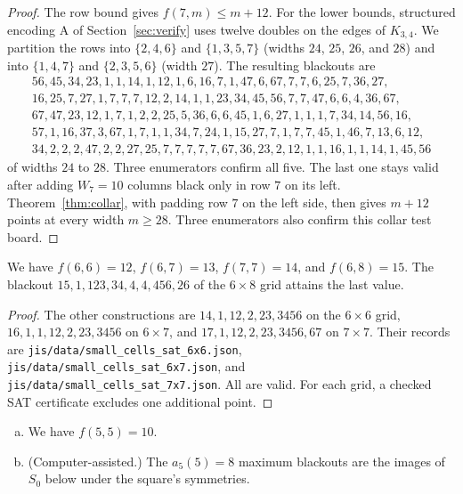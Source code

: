 \begin{proof}
The row bound gives $f(7,m)\le m+12$. For the lower bounds, structured encoding A
of Section~\ref{sec:verify} uses twelve doubles on the edges of $K_{3,4}$.
We partition the rows into $\{2,4,6\}$ and $\{1,3,5,7\}$ (widths $24$, $25$, $26$, and $28$) and into
$\{1,4,7\}$ and $\{2,3,5,6\}$ (width $27$). The resulting blackouts are
\begin{gather*}
56,45,34,23,1,1,14,1,12,1,6,16,7,1,47,6,67,7,7,6,25,7,36,27,\\
16,25,7,27,1,7,7,7,12,2,14,1,1,23,34,45,56,7,7,47,6,6,4,36,67,\\
67,47,23,12,1,7,1,2,2,25,5,36,6,6,45,1,6,27,1,1,1,7,34,14,56,16,\\
57,1,16,37,3,67,1,7,1,1,34,7,24,1,15,27,7,1,7,7,45,1,46,7,13,6,12,\\
34,2,2,2,47,2,2,27,25,7,7,7,7,7,67,36,23,2,12,1,1,16,1,1,14,1,45,56
\end{gather*}
of widths $24$ to $28$. Three enumerators confirm all five. The last one stays valid after adding
$W_7=10$ columns black only in row $7$ on its left. Theorem~\ref{thm:collar}, with padding
row $7$ on the left side, then gives $m+12$ points at every width $m\ge28$.
Three enumerators also confirm this collar test board.
\end{proof}

\begin{theorem}\label{thm:refute}
We have $f(6,6)=12$, $f(6,7)=13$, $f(7,7)=14$, and $f(6,8)=15$. The blackout
$15,\allowbreak 1,\allowbreak 123,\allowbreak 34,\allowbreak 4,\allowbreak 4,\allowbreak 456,\allowbreak 26$ of the $6\times8$ grid attains the last value.
\end{theorem}

\begin{proof}
The other constructions are $14,\allowbreak 1,\allowbreak 12,\allowbreak 2,\allowbreak 23,\allowbreak 3456$
on the $6\times6$ grid,
$16,\allowbreak 1,\allowbreak 1,\allowbreak 12,\allowbreak 2,\allowbreak 23,\allowbreak 3456$
on $6\times7$, and
$17,\allowbreak 1,\allowbreak 12,\allowbreak 2,\allowbreak 23,\allowbreak 3456,\allowbreak 67$
on $7\times7$. Their records are
\nolinkurl{jis/data/small_cells_sat_6x6.json},
\nolinkurl{jis/data/small_cells_sat_6x7.json}, and
\nolinkurl{jis/data/small_cells_sat_7x7.json}.
All are valid. For each grid, a checked SAT certificate excludes
one additional point.
\end{proof}

\begin{theorem}\label{thm:fivefive}
\leavevmode
\begin{enumerate}[(a)]
\item We have $f(5,5)=10$.
\item (Computer-assisted.) The $a_5(5)=8$ maximum blackouts are the images of $S_0$
below under the square's symmetries.
\end{enumerate}
\end{theorem}

